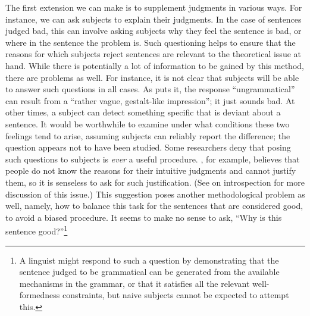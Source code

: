 The first extension we can make is to supplement judgments in various ways. For instance, we can ask subjects to explain their judgments. In the case of sentences judged bad, this can involve asking subjects why they feel the sentence is bad, or where in the sentence the problem is. Such questioning helps to ensure that the reasons for which subjects reject sentences are relevant to the theoretical issue at hand. While there is potentially a lot of information to be gained by this method, there are problems as well. For instance, it is not clear that subjects will be able to answer such questions in all cases. As \citet[110]{Birdsong1989} puts it, the response
``ungrammatical'' can result from a ``rather vague, gestalt-like impression''; it just sounds bad. At other times, a subject can detect something specific that is deviant about a sentence. It would be worthwhile to examine under what conditions these two feelings tend to arise, assuming subjects can reliably
report  the difference;  the question  appears  not to have been  studied. Some researchers deny that posing such questions to subjects is \textit{ever} a useful procedure. \citet{Botha1981}, for example, believes that people do not know the reasons for their intuitive judgments  and cannot justify  them,  so it is senseless  to  ask for  such justification.  (See  on introspection for more discussion of this issue.) This suggestion poses another methodological  problem as well, namely, how to balance this task for the sentences that are considered good, to avoid a biased procedure. It seems to make no sense to ask, ``Why is this sentence good?''\footnote{A linguist might respond to such a question by demonstrating that the sentence judged to be grammatical can be generated from the available mechanisms in the grammar, or that it satisfies all the relevant well-formedness constraints, but naive subjects cannot be expected to attempt this.}
